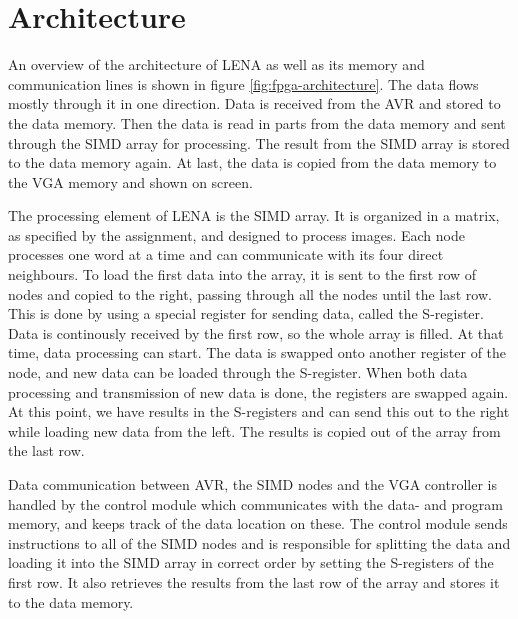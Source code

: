 \section{Architecture}




An overview of the architecture of LENA as well as its memory and communication
lines is shown in figure \ref{fig:fpga-architecture}. The data flows mostly
through it in one direction. Data is received from the AVR and stored to the
data memory. Then the data is read in parts from the data memory and sent
through the SIMD array for processing. The result from the SIMD array is stored
to the data memory again. At last, the data is copied from the data memory to
the VGA memory and shown on screen.


The processing element of LENA is the SIMD array. It is organized in a matrix,
as specified by the assignment, and designed to process images. Each node
processes one word at a time and can communicate with its four direct
neighbours. To load the first data into the array, it is sent to the first row
of nodes and copied to the right, passing through all the nodes until the last
row. This is done by using a special register for sending data, called the
S-register. Data is continously received by the first row, so the whole array is
filled. At that time, data processing can start. The data is swapped onto
another register of the node, and new data can be loaded through the S-register.
When both data processing and transmission of new data is done, the registers
are swapped again. At this point, we have results in the S-registers and can
send this out to the right while loading new data from the left. The results is
copied out of the array from the last row.

Data communication between AVR, the SIMD nodes and the VGA controller is handled
by the control module which communicates with the data- and program memory, and
keeps track of the data location on these. The control module sends instructions
to all of the SIMD nodes and is responsible for splitting the data and loading
it into the SIMD array in correct order by setting the S-registers of the first
row. It also retrieves the results from the last row of the array and stores it
to the data memory.

